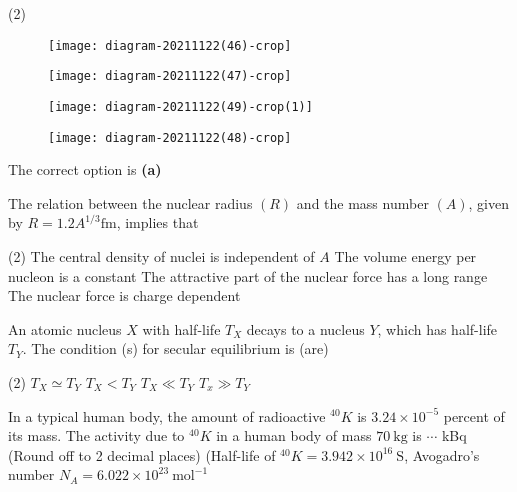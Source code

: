 \begin{enumerate}[ label=\color{ocre}\textbf{\arabic*.}]
\begin{minipage}{\textwidth}
\end{minipage}
\begin{tasks}(2)
	\task[\textbf{A.}]\begin{figure}[H]
		\centering
		\texttt{[image: diagram-20211122(46)-crop]}
	\end{figure}
	\task[\textbf{B.}]\begin{figure}[H]
		\centering
		\texttt{[image: diagram-20211122(47)-crop]}
	\end{figure}
	\task[\textbf{C.}]\begin{figure}[H]
		\centering
		\texttt{[image: diagram-20211122(49)-crop(1)]}
	\end{figure}
	\task[\textbf{D.}]\begin{figure}[H]
		\centering
		\texttt{[image: diagram-20211122(48)-crop]}
	\end{figure}
\end{tasks}
\begin{answer}
The correct option is \textbf{(a)}	
\end{answer}
\begin{minipage}{\textwidth}
	\item The relation between the nuclear radius $(R)$ and the mass number $(A)$, given by $R=1.2 A^{1 / 3} \mathrm{fm}$, implies that
\end{minipage}
\begin{tasks}(2)
	\task[\textbf{A.}]The central density of nuclei is independent of $A$
	\task[\textbf{B.}]The volume energy per nucleon is a constant
	\task[\textbf{C.}]The attractive part of the nuclear force has a long range
	\task[\textbf{D.}]The nuclear force is charge dependent
\end{tasks}
\begin{minipage}{\textwidth}
	\item An atomic nucleus $X$ with half-life $T_{X}$ decays to a nucleus $Y$, which has half-life $T_{Y}$. The condition (s) for secular equilibrium is (are)
\end{minipage}
\begin{tasks}(2)
	\task[\textbf{A.}] $T_{X} \simeq T_{Y}$
	\task[\textbf{B.}]$T_{X}<T_{Y}$
	\task[\textbf{C.}]$T_{X} \ll T_{Y}$
	\task[\textbf{D.}] $T_{x} \gg T_{Y}$
\end{tasks}
\begin{minipage}{\textwidth}
	\item In a typical human body, the amount of radioactive ${ }^{40} K$ is $3.24 \times 10^{-5}$ percent of its mass.
	The activity due to ${ }^{40} K$ in a human body of mass $70 \mathrm{~kg}$ is $\cdots$ kBq
	(Round off to 2 decimal places)
	(Half-life of ${ }^{40} K=3.942 \times 10^{16} \mathrm{~S}$, Avogadro's number $N_{A}=6.022 \times 10^{23} \mathrm{~mol}^{-1}$
\end{minipage}
\end{enumerate}
